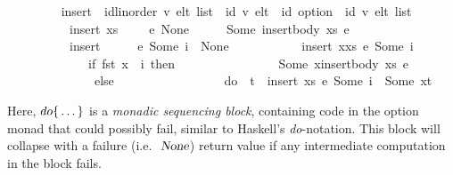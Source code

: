 \documentclass[acmlarge,review,anonymous]{acmart}\settopmatter{printfolios=true}
\begin{document}
\begin{isabellebody}
\ \ \ \ \ \ \ \  insert\ {\isacharcolon}{\isacharcolon}\ {\isachardoublequoteopen}{\isacharparenleft}{\isacharprime}id{\isacharcolon}{\isacharcolon}{\isacharbraceleft}linorder{\isacharbraceright}{\isacharcomma}\ {\isacharprime}v{\isacharparenright}\ elt\ list\ {\isasymRightarrow}\ {\isacharparenleft}{\isacharprime}id{\isacharcomma}\ {\isacharprime}v{\isacharparenright}\ elt\ {\isasymRightarrow}\ {\isacharprime}id\ option\ {\isasymrightharpoonup}\ {\isacharparenleft}{\isacharprime}id{\isacharcomma}\ {\isacharprime}v{\isacharparenright}\ elt\ list{\isachardoublequoteclose}\ \isanewline
\ \ \ \ \ \ \ \ \ \ {\isachardoublequoteopen}insert\ xs\ \ \ \ \ e\ None\ \ \ \ \ {\isacharequal}\ Some\ {\isacharparenleft}insert{\isacharunderscore}body\ xs\ e{\isacharparenright}{\isachardoublequoteclose}\ {\isacharbar}\isanewline
\ \ \ \ \ \ \ \ \ \ {\isachardoublequoteopen}insert\ {\isacharbrackleft}{\isacharbrackright}\ \ \ \ \ e\ {\isacharparenleft}Some\ i{\isacharparenright}\ {\isacharequal}\ None{\isachardoublequoteclose}\ {\isacharbar}\isanewline
\ \ \ \ \ \ \ \ \ \ {\isachardoublequoteopen}insert\ {\isacharparenleft}x{\isacharhash}xs{\isacharparenright}\ e\ {\isacharparenleft}Some\ i{\isacharparenright}\ {\isacharequal}\isanewline
\ \ \ \ \ \ \ \ \ \ \ \ \ {\isacharparenleft}if\ fst\ x\ {\isacharequal}\ i\ then\isanewline
\ \ \ \ \ \ \ \ \ \ \ \ \ \ \ \ Some\ {\isacharparenleft}x{\isacharhash}insert{\isacharunderscore}body\ xs\ e{\isacharparenright}\isanewline
\ \ \ \ \ \ \ \ \ \ \ \ \ \ else\ \isanewline
\ \ \ \ \ \ \ \ \ \ \ \ \ \ \ \ do\ {\isacharbraceleft}\ t\ {\isasymleftarrow}\ insert\ xs\ e\ {\isacharparenleft}Some\ i{\isacharparenright}\ {\isacharsemicolon}\ Some\ {\isacharparenleft}x{\isacharhash}t{\isacharparenright}\ {\isacharbraceright}{\isacharparenright}{\isachardoublequoteclose}
\end{isabellebody}
\vspace{\baselineskip}
Here, $do {\emph{$\{$}} \ldots {\emph{$\}$}}$ is a \emph{monadic sequencing block}, containing code in the option monad that could possibly fail, similar to Haskell's \emph{do}-notation.
This block will collapse with a failure (i.e. $\isa{None}$) return value if any intermediate computation in the block fails.
\end{document}
